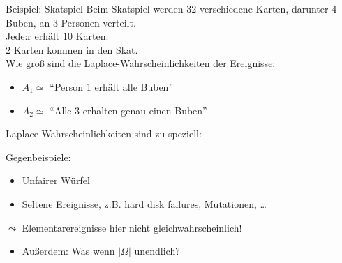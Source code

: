 \documentclass[
  10pt,
  ignorenonframetext,
]{beamer}
\providecommand{\tightlist}{%
  \setlength{\itemsep}{0pt}\setlength{\parskip}{0pt}}
\begin{document}
\begin{frame}{Beispiel: Skatspiel}
\label{beispiel-skatspiel}
Beim Skatspiel werden \(32\) verschiedene Karten, darunter \(4\) Buben,
an \(3\) Personen verteilt.\\
Jede:r erhält \(10\) Karten.\\
\(2\) Karten kommen in den Skat.\\
Wie groß sind die Laplace-Wahrscheinlichkeiten der Ereignisse:

\begin{itemize}
\tightlist
\item
  \(A_1  \simeq\) ``Person 1 erhält alle Buben''
\item
  \(A_2 \simeq\) ``Alle 3 erhalten genau einen Buben''
\end{itemize}

\end{frame}

\begin{frame}{Laplace-Wahrscheinlichkeiten sind zu speziell:}
\label{laplace-wahrscheinlichkeiten-sind-zu-speziell}
\vspace{-1cm}

Gegenbeispiele:

\begin{itemize}
\tightlist
\item
  Unfairer Würfel
\item
  Seltene Ereignisse, z.B. hard disk failures, Mutationen, \ldots{}
\end{itemize}

\(\leadsto\) Elementarereignisse hier nicht gleichwahrscheinlich!

\begin{itemize}
\tightlist
\item
  Außerdem: Was wenn \(|\Omega|\) unendlich?
\end{itemize}
\end{frame}
\end{document}
